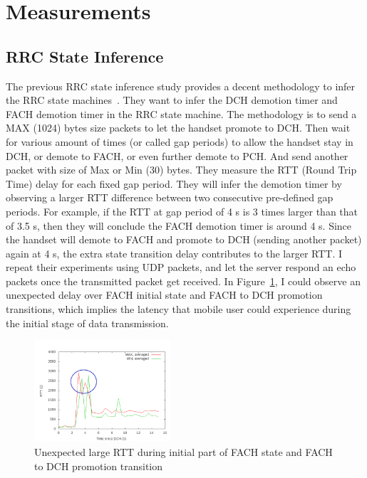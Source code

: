 \section{Measurements}

\subsection{RRC State Inference}
The previous RRC state inference study provides a decent methodology to infer the RRC state machines~\cite{3g_rrc}. They want to infer the DCH demotion timer and FACH demotion timer in the RRC state machine. The methodology is to send a MAX (1024) bytes size packets to let the handset promote to DCH. Then wait for various amount of times (or called gap periods) to allow the handset stay in DCH, or demote to FACH, or even further demote to PCH. And send another packet with size of Max or Min (30) bytes. They measure the RTT (Round Trip Time) delay for each fixed gap period. They will infer the demotion timer by observing a larger RTT difference between two consecutive pre-defined gap periods. For example, if the RTT at gap period of 4 s is 3 times larger than that of 3.5 s, then they will conclude the FACH demotion timer is around 4 s. Since the handset will demote to FACH and promote to DCH (sending another packet) again at 4 s, the extra state transition delay contributes to the larger RTT. I repeat their experiments using UDP packets, and let the server respond an echo packets once the transmitted packet get received. In Figure~\ref{fig:rrc.infer}, I could observe an unexpected delay over FACH initial state and FACH to DCH promotion transitions, which implies the latency that mobile user could experience during the initial stage of data transmission.

\begin{figure}
\centering
\includegraphics[width=0.45\textwidth]{figs/rrc_infer.png}
\caption{Unexpected large RTT during initial part of FACH state and FACH to DCH promotion transition}
\label{fig:rrc.infer}
\end{figure}

